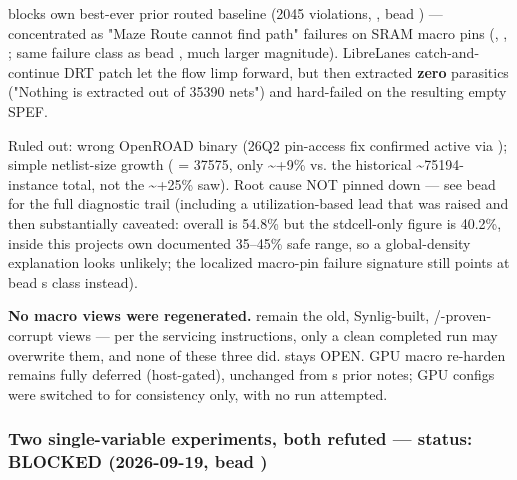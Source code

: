 \begin{record}
\begin{enumerate}
  block\textquotesingle s own best-ever prior routed baseline (2045
  violations, , bead ) ---
  concentrated as  "Maze Route cannot find path" failures
  on SRAM macro pins
  (,
  , ; same failure class as bead
  , much larger magnitude). LibreLane\textquotesingle s
  catch-and-continue DRT patch let the flow limp forward, but
   then extracted \textbf{zero} parasitics ("Nothing
  is extracted out of 35390 nets") and 
  hard-failed on the resulting empty SPEF.
\end{enumerate}

Ruled out: wrong OpenROAD binary (26Q2 pin-access fix confirmed active
via ); simple netlist-size growth
( = 37575, only
\textasciitilde+9\% vs. the historical \textasciitilde75194-instance
total, not the \textasciitilde+25\%  saw). Root cause NOT
pinned down --- see bead  for the full
diagnostic trail (including a utilization-based lead that was raised and
then substantially caveated: overall
 is 54.8\% but the stdcell-only
figure is 40.2\%, inside this project\textquotesingle s own documented
35--45\% safe range, so a global-density explanation looks unlikely; the
localized macro-pin failure signature still points at bead
\textquotesingle s class instead).

\textbf{No macro views were regenerated.}
 remain the old, Synlig-built,
/-proven-corrupt views --- per the servicing
instructions, only a clean completed run may overwrite them, and none of
these three did.  stays OPEN. GPU macro re-harden remains
fully deferred (host-gated), unchanged from \textquotesingle s
prior notes; GPU configs were switched to  for
consistency only, with no run attempted.

\end{record}

\subsubsection{\texorpdfstring{Two single-variable experiments, both
refuted --- status: BLOCKED (2026-09-19, bead
)}{Two single-variable experiments, both refuted --- status: BLOCKED (2026-09-19, bead )}}\label{cr:run:asap7:two-single-variable-experiments-both-refuted-status-blocked-2026-09-19-bead-lxv}

